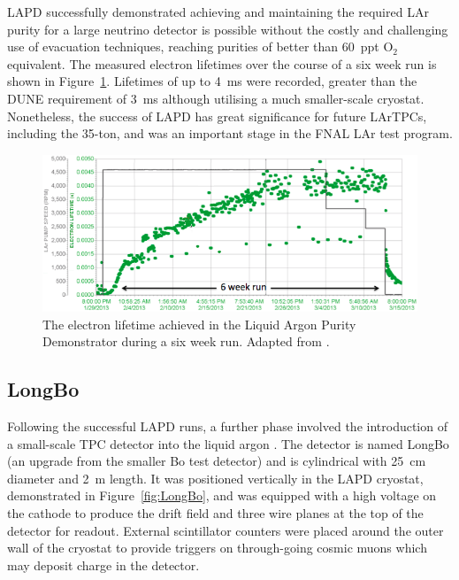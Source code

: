 LAPD successfully demonstrated achieving and maintaining the required LAr purity for a large neutrino detector is possible without the costly and challenging use of evacuation techniques, reaching purities of better than 60~ppt O$_2$ equivalent.  The measured electron lifetimes over the course of a six week run is shown in Figure~\ref{fig:LAPDElectronLifetime}.  Lifetimes of up to 4~ms were recorded, greater than the DUNE requirement of 3~ms although utilising a much smaller-scale cryostat.  Nonetheless, the success of LAPD has great significance for future LArTPCs, including the 35-ton, and was an important stage in the FNAL LAr test program.

\begin{figure}[ht]
  \centering
  \includegraphics[width=12cm]{LAPDElectronLifetime.png}
  \caption[The electron lifetime achieved in the Liquid Argon Purity Demonstrator during a six week run.]{The electron lifetime achieved in the Liquid Argon Purity Demonstrator during a six week run.  Adapted from \cite{LAPD2014}.}
  \label{fig:LAPDElectronLifetime}
\end{figure}

\subsection{LongBo}\label{sec:LongBo}

Following the successful LAPD runs, a further phase involved the introduction of a small-scale TPC detector into the liquid argon \cite{LongBo2015}.  The detector is named LongBo (an upgrade from the smaller Bo test detector) and is cylindrical with 25~cm diameter and 2~m length.  It was positioned vertically in the LAPD cryostat, demonstrated in Figure~\ref{fig:LongBo}, and was equipped with a high voltage on the cathode to produce the drift field and three wire planes at the top of the detector for readout.  External scintillator counters were placed around the outer wall of the cryostat to provide triggers on through-going cosmic muons which may deposit charge in the detector.

